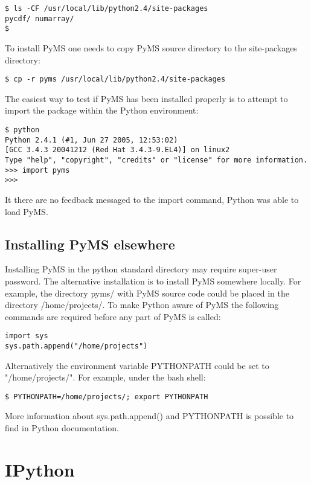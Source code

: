 \begin{verbatim}
$ ls -CF /usr/local/lib/python2.4/site-packages
pycdf/ numarray/
$ 
\end{verbatim}

To install PyMS one needs to copy PyMS source directory to
the site-packages directory:

\begin{verbatim}
$ cp -r pyms /usr/local/lib/python2.4/site-packages
\end{verbatim}

The easiest way to test if PyMS has been installed properly is 
to attempt to import the package within the Python environment:

\begin{verbatim}
$ python
Python 2.4.1 (#1, Jun 27 2005, 12:53:02) 
[GCC 3.4.3 20041212 (Red Hat 3.4.3-9.EL4)] on linux2
Type "help", "copyright", "credits" or "license" for more information.
>>> import pyms
>>>
\end{verbatim}

It there are no feedback messaged to the import command, Python
was able to load PyMS. 

\subsection{Installing PyMS elsewhere}

Installing PyMS in the python standard directory may require
super-user password. The alternative installation is to install
PyMS somewhere locally. For example, the directory pyms/ with
PyMS source code could be placed in the directory /home/projects/.
To make Python aware of PyMS the following commands are required
before any part of PyMS is called:

\begin{verbatim}
import sys
sys.path.append("/home/projects")
\end{verbatim}

Alternatively the environment variable PYTHONPATH could be set
to "/home/projects/". For example, under the bash shell: 

\begin{verbatim}
$ PYTHONPATH=/home/projects/; export PYTHONPATH
\end{verbatim}

More information about sys.path.append() and PYTHONPATH is possible
to find in Python documentation.

\section{IPython}


